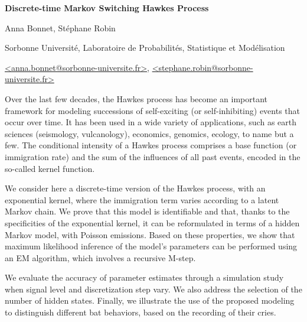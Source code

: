 \documentclass[12pt]{article}
\begin{document}

\begin{center}
{\bf {\large Discrete-time Markov Switching Hawkes Process}}

\bigskip
{Anna {\sc Bonnet}, Stéphane {\sc Robin}}

\bigskip
{Sorbonne Université, Laboratoire de Probabilités, Statistique et Modélisation} 

\bigskip\url{<anna.bonnet@sorbonne-universite.fr>}, \url{<stephane.robin@sorbonne-universite.fr>}
\end{center}

\bigskip
Over the last few decades, the Hawkes process has become an important framework for modeling successions of self-exciting (or self-inhibiting) events that occur over time. It has been used in a wide variety of applications, such as earth sciences (seismology, vulcanology), economics, genomics, ecology, to name but a few. The conditional intensity of a Hawkes process comprises a base function (or immigration rate) and the sum of the influences of all past events, encoded in the so-called kernel function. 

\bigskip
We consider here a discrete-time version of the Hawkes process, with an exponential kernel, where the immigration term varies according to a latent Markov chain. We prove that this model is identifiable and that, thanks to the specificities of the exponential kernel, it can be reformulated in terms of a hidden Markov model, with Poisson emissions. Based on these properties, we show that maximum likelihood inference of the model's parameters can be performed using an EM algorithm, which involves a recursive M-step.

\bigskip
We evaluate the accuracy of parameter estimates through a simulation study when signal level and discretization step vary. We also address the selection of the number of hidden states. Finally, we illustrate the use of the proposed modeling to distinguish different bat behaviors, based on the recording of their cries.

\end{document}
